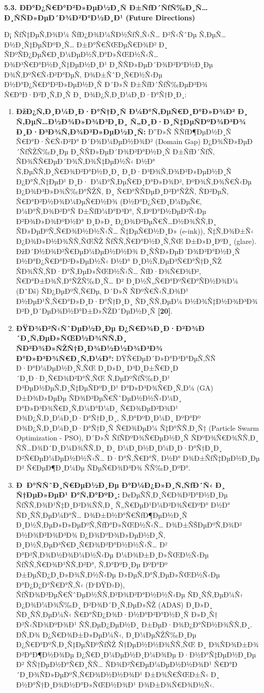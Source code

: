 \documentclass[]{article}
\begin{document}
\textbf{5.3. ÐÐ°Ð¿Ñ€Ð°Ð²Ð»ÐµÐ½Ð¸Ñ Ð±ÑƒÐ´ÑƒÑ‰Ð¸Ñ… Ð¸ÑÑÐ»ÐµÐ´Ð¾Ð²Ð°Ð½Ð¸Ð¹ (Future Directions)}

Ð¡ ÑƒÑ‡ÐµÑ‚Ð¾Ð¼ ÑƒÐ¿Ð¾Ð¼ÑÐ½ÑƒÑ‚Ñ‹Ñ… Ð²Ñ‹ÑˆÐµ Ñ‚ÐµÑ…Ð½Ð¸Ñ‡ÐµÑÐºÐ¸Ñ… Ð±Ð°Ñ€ÑŒÐµÑ€Ð¾Ð² Ð¸ ÑÐºÑÐ¿ÐµÑ€Ð¸Ð¼ÐµÐ½Ñ‚Ð°Ð»ÑŒÐ½Ñ‹Ñ… Ð¾Ð³Ñ€Ð°Ð½Ð¸Ñ‡ÐµÐ½Ð¸Ð¹ Ð¸ÑÑÐ»ÐµÐ´Ð¾Ð²Ð°Ð½Ð¸Ðµ Ð¾Ñ‚ÐºÑ€Ñ‹Ð²Ð°ÐµÑ‚ Ð¾Ð±ÑˆÐ¸Ñ€Ð½Ñ‹Ðµ Ð½Ð°Ð¿Ñ€Ð°Ð²Ð»ÐµÐ½Ð¸Ñ Ð´Ð»Ñ Ð±ÑƒÐ´ÑƒÑ‰ÐµÐ³Ð¾ Ñ€Ð°Ð·Ð²Ð¸Ñ‚Ð¸Ñ Ð¸ Ð¾Ð¿Ñ‚Ð¸Ð¼Ð¸Ð·Ð°Ñ†Ð¸Ð¸:

\begin{enumerate}
\def\labelenumi{\arabic{enumi}.}
\item
  \textbf{ÐžÐ¿Ñ‚Ð¸Ð¼Ð¸Ð·Ð°Ñ†Ð¸Ñ Ð¼Ð°Ñ‚ÐµÑ€Ð¸Ð°Ð»Ð¾Ð² Ð¸ Ñ‚ÐµÑ…Ð½Ð¾Ð»Ð¾Ð³Ð¸Ð¸ Ñ„Ð¸Ð·Ð¸Ñ‡ÐµÑÐºÐ¾Ð³Ð¾ Ð¸Ð·Ð³Ð¾Ñ‚Ð¾Ð²Ð»ÐµÐ½Ð¸Ñ:} Ð”Ð»Ñ ÑÑƒÐ¶ÐµÐ½Ð¸Ñ Ñ€Ð°Ð·Ñ€Ñ‹Ð²Ð° Ð´Ð¾Ð¼ÐµÐ½Ð¾Ð² (Domain Gap) Ð¿Ð¾ÑÐ»ÐµÐ´ÑƒÑŽÑ‰Ð¸Ðµ Ð¸ÑÑÐ»ÐµÐ´Ð¾Ð²Ð°Ð½Ð¸Ñ Ð±ÑƒÐ´ÑƒÑ‚ ÑÐ¾ÑÑ€ÐµÐ´Ð¾Ñ‚Ð¾Ñ‡ÐµÐ½Ñ‹ Ð½Ð° Ñ‚ÐµÑÑ‚Ð¸Ñ€Ð¾Ð²Ð°Ð½Ð¸Ð¸ Ð¸Ð·Ð³Ð¾Ñ‚Ð¾Ð²Ð»ÐµÐ½Ð¸Ñ Ð¿Ð°Ñ‚Ñ‡ÐµÐ¹ Ð¸Ð· Ð¼Ð°Ñ‚ÐµÑ€Ð¸Ð°Ð»Ð¾Ð², ÐºÐ¾Ñ‚Ð¾Ñ€Ñ‹Ðµ Ð¿Ð¾Ð³Ð»Ð¾Ñ‰Ð°ÑŽÑ‚ Ð¸ Ñ€Ð°ÑÑÐµÐ¸Ð²Ð°ÑŽÑ‚ ÑÐ²ÐµÑ‚ Ñ€Ð°Ð²Ð½Ð¾Ð¼ÐµÑ€Ð½Ð¾ (Ð½Ð°Ð¿Ñ€Ð¸Ð¼ÐµÑ€, Ð¼Ð°Ñ‚Ð¾Ð²Ð°Ñ Ð±ÑƒÐ¼Ð°Ð³Ð°, Ñ‚ÐºÐ°Ð½ÐµÐ²Ñ‹Ðµ Ð²Ð¾Ð»Ð¾ÐºÐ½Ð° Ð¸Ð»Ð¸ Ð¿Ð¾Ð²ÐµÑ€Ñ…Ð½Ð¾ÑÑ‚Ð¸ ÑÐ»ÐµÐºÑ‚Ñ€Ð¾Ð½Ð½Ñ‹Ñ… Ñ‡ÐµÑ€Ð½Ð¸Ð» (e-ink)), Ñ‡Ñ‚Ð¾Ð±Ñ‹ Ð¿Ð¾Ð»Ð½Ð¾ÑÑ‚ÑŒÑŽ ÑƒÑÑ‚Ñ€Ð°Ð½Ð¸Ñ‚ÑŒ Ð±Ð»Ð¸ÐºÐ¸ (glare). ÐžÐ´Ð½Ð¾Ð²Ñ€ÐµÐ¼ÐµÐ½Ð½Ð¾ Ð¸ÑÑÐ»ÐµÐ´Ð¾Ð²Ð°Ð½Ð¸Ñ Ð½Ð°Ð¿Ñ€Ð°Ð²Ð»ÐµÐ½Ñ‹ Ð½Ð° Ð¸Ð½Ñ‚ÐµÐ³Ñ€Ð°Ñ†Ð¸ÑŽ ÑÐ¾ÑÑ‚ÑÐ·Ð°Ñ‚ÐµÐ»ÑŒÐ½Ñ‹Ñ… ÑƒÐ·Ð¾Ñ€Ð¾Ð², Ñ€Ð°Ð±Ð¾Ñ‚Ð°ÑŽÑ‰Ð¸Ñ… Ð² Ð¸Ð½Ñ„Ñ€Ð°ÐºÑ€Ð°ÑÐ½Ð¾Ð¼ (Ð˜Ðš) ÑÐ¿ÐµÐºÑ‚Ñ€Ðµ, Ð´Ð»Ñ ÑÐºÑ€Ñ‹Ñ‚Ð¾Ð¹ Ð½ÐµÐ¹Ñ‚Ñ€Ð°Ð»Ð¸Ð·Ð°Ñ†Ð¸Ð¸ ÑÐ¸ÑÑ‚ÐµÐ¼ Ð½Ð¾Ñ‡Ð½Ð¾Ð³Ð¾ Ð²Ð¸Ð´ÐµÐ¾Ð½Ð°Ð±Ð»ÑŽÐ´ÐµÐ½Ð¸Ñ \textbf{{[}20{]}}.
\item
  \textbf{ÐŸÐ¾Ð²Ñ‹ÑˆÐµÐ½Ð¸Ðµ Ð¿Ñ€Ð¾Ð¸Ð·Ð²Ð¾Ð´Ð¸Ñ‚ÐµÐ»ÑŒÐ½Ð¾ÑÑ‚Ð¸ ÑÐ²Ð¾Ð»ÑŽÑ†Ð¸Ð¾Ð½Ð½Ð¾Ð³Ð¾ Ð°Ð»Ð³Ð¾Ñ€Ð¸Ñ‚Ð¼Ð°:} ÐŸÑ€ÐµÐ´Ð»Ð°Ð³Ð°ÐµÑ‚ÑÑ Ð·Ð°Ð¼ÐµÐ½Ð¸Ñ‚ÑŒ Ð¸Ð»Ð¸ Ð³Ð¸Ð±Ñ€Ð¸Ð´Ð¸Ð·Ð¸Ñ€Ð¾Ð²Ð°Ñ‚ÑŒ Ñ‚ÐµÐºÑƒÑ‰Ð¸Ð¹ Ð³ÐµÐ½ÐµÑ‚Ð¸Ñ‡ÐµÑÐºÐ¸Ð¹ Ð°Ð»Ð³Ð¾Ñ€Ð¸Ñ‚Ð¼ (GA) Ð±Ð¾Ð»ÐµÐµ ÑÐ¾Ð²ÐµÑ€ÑˆÐµÐ½Ð½Ñ‹Ð¼Ð¸ Ð°Ð»Ð³Ð¾Ñ€Ð¸Ñ‚Ð¼Ð°Ð¼Ð¸ Ñ€Ð¾ÐµÐ²Ð¾Ð¹ Ð¾Ð¿Ñ‚Ð¸Ð¼Ð¸Ð·Ð°Ñ†Ð¸Ð¸, Ñ‚Ð°ÐºÐ¸Ð¼Ð¸ ÐºÐ°Ðº Ð¾Ð¿Ñ‚Ð¸Ð¼Ð¸Ð·Ð°Ñ†Ð¸Ñ Ñ€Ð¾ÐµÐ¼ Ñ‡Ð°ÑÑ‚Ð¸Ñ† (Particle Swarm Optimization - PSO), Ð´Ð»Ñ ÑƒÑÐºÐ¾Ñ€ÐµÐ½Ð¸Ñ ÑÐºÐ¾Ñ€Ð¾ÑÑ‚Ð¸ ÑÑ…Ð¾Ð´Ð¸Ð¼Ð¾ÑÑ‚Ð¸ Ð¸ Ð¼Ð¸Ð½Ð¸Ð¼Ð¸Ð·Ð°Ñ†Ð¸Ð¸ Ð²Ñ€ÐµÐ¼ÐµÐ½Ð½Ñ‹Ñ… Ð·Ð°Ñ‚Ñ€Ð°Ñ‚ Ð½Ð° Ð¾Ð±ÑƒÑ‡ÐµÐ½Ð¸Ðµ Ð² Ñ€ÐµÐ¶Ð¸Ð¼Ðµ ÑÐµÑ€Ð¾Ð³Ð¾ ÑÑ‰Ð¸ÐºÐ°.
\item
  \textbf{Ð Ð°ÑÑˆÐ¸Ñ€ÐµÐ½Ð¸Ðµ Ð°Ð¼Ð¿Ð»Ð¸Ñ‚ÑƒÐ´Ñ‹ Ð¸ Ñ†ÐµÐ»ÐµÐ¹ Ð°Ñ‚Ð°ÐºÐ¸:} Ð¢ÐµÑÑ‚Ð¸Ñ€Ð¾Ð²Ð°Ð½Ð¸Ðµ ÑƒÑÑ‚Ð¾Ð¹Ñ‡Ð¸Ð²Ð¾ÑÑ‚Ð¸ Ñ„Ñ€ÐµÐ¹Ð¼Ð²Ð¾Ñ€ÐºÐ° Ð½Ð° ÑÐ¸ÑÑ‚ÐµÐ¼Ð°Ñ… Ð¾Ð±Ð½Ð°Ñ€ÑƒÐ¶ÐµÐ½Ð¸Ñ Ð¸Ð½Ñ‚ÐµÐ»Ð»ÐµÐºÑ‚ÑƒÐ°Ð»ÑŒÐ½Ñ‹Ñ… Ð¾Ð±ÑŠÐµÐºÑ‚Ð¾Ð² Ð½Ð¾Ð²Ð¾Ð³Ð¾ Ð¿Ð¾ÐºÐ¾Ð»ÐµÐ½Ð¸Ñ, Ð¸Ð½Ñ‚ÐµÐ³Ñ€Ð¸Ñ€Ð¾Ð²Ð°Ð½Ð½Ñ‹Ñ… Ð² Ð°Ð²Ñ‚Ð¾Ð½Ð¾Ð¼Ð½Ñ‹Ðµ Ð¼Ð¾Ð±Ð¸Ð»ÑŒÐ½Ñ‹Ðµ ÑƒÑÑ‚Ñ€Ð¾Ð¹ÑÑ‚Ð²Ð°, Ñ‚Ð°ÐºÐ¸Ðµ ÐºÐ°Ðº Ð±ÐµÑÐ¿Ð¸Ð»Ð¾Ñ‚Ð½Ñ‹Ðµ Ð»ÐµÑ‚Ð°Ñ‚ÐµÐ»ÑŒÐ½Ñ‹Ðµ Ð°Ð¿Ð¿Ð°Ñ€Ð°Ñ‚Ñ‹ (Ð‘ÐŸÐ›Ð), ÑƒÑÐ¾Ð²ÐµÑ€ÑˆÐµÐ½ÑÑ‚Ð²Ð¾Ð²Ð°Ð½Ð½Ñ‹Ðµ ÑÐ¸ÑÑ‚ÐµÐ¼Ñ‹ Ð¿Ð¾Ð¼Ð¾Ñ‰Ð¸ Ð²Ð¾Ð´Ð¸Ñ‚ÐµÐ»ÑŽ (ADAS) Ð¸Ð»Ð¸ ÑÐ¸ÑÑ‚ÐµÐ¼Ñ‹ Ñ€Ð°ÑÐ¿Ð¾Ð·Ð½Ð°Ð²Ð°Ð½Ð¸Ñ Ð»Ð¸Ñ† Ð²Ñ‹ÑÐ¾ÐºÐ¾Ð¹ ÑÑ‚ÐµÐ¿ÐµÐ½Ð¸ Ð±ÐµÐ·Ð¾Ð¿Ð°ÑÐ½Ð¾ÑÑ‚Ð¸. Ð­Ñ‚Ð¾ Ð¿Ñ€Ð¾Ð±Ð»ÐµÐ¼Ñ‹, Ð¸Ð¼ÐµÑŽÑ‰Ð¸Ðµ Ð¿Ñ€Ð°ÐºÑ‚Ð¸Ñ‡ÐµÑÐºÑƒÑŽ Ñ†ÐµÐ½Ð½Ð¾ÑÑ‚ÑŒ Ð¸ Ð¾ÑÐ¾Ð±Ð¾ Ð²Ð°Ð¶Ð½Ð¾Ðµ Ð¿Ñ€Ð¸Ð¼ÐµÐ½Ð¸Ð¼Ð¾Ðµ Ð·Ð½Ð°Ñ‡ÐµÐ½Ð¸Ðµ Ð² ÑÑ†ÐµÐ½Ð°Ñ€Ð¸ÑÑ… ÑÐ¾Ð²Ñ€ÐµÐ¼ÐµÐ½Ð½Ð¾Ð¹ Ñ€Ð°Ð´Ð¸Ð¾ÑÐ»ÐµÐºÑ‚Ñ€Ð¾Ð½Ð½Ð¾Ð¹ Ð±Ð¾Ñ€ÑŒÐ±Ñ‹ Ð¸ Ð½Ð°Ñ†Ð¸Ð¾Ð½Ð°Ð»ÑŒÐ½Ð¾Ð¹ Ð¾Ð±Ð¾Ñ€Ð¾Ð½Ñ‹.

\end{enumerate}
\end{document}
